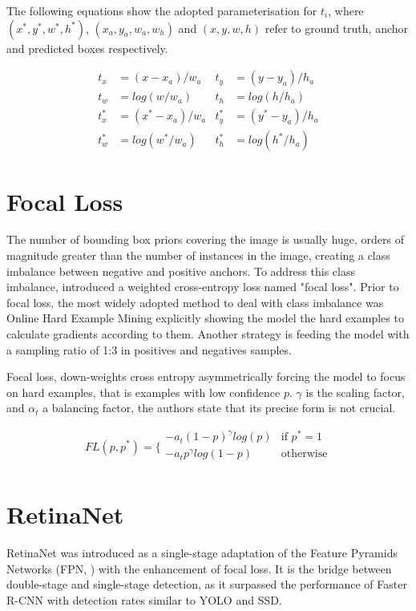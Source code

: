 The following equations show the adopted parameterisation for $t_i$, where $(x^*,y^*,w^*,h^*)$, $(x_a,y_a,w_a,w_h)$ and $(x,y,w,h)$ refer to ground truth, anchor and predicted boxes respectively. 

\begin{align}
t_x		&= (x-x_a)/w_a			&		t_y	&= (y-y_a)/h_a \\
t_w		&= log(w/w_a)			&		t_h 	&= log(h/h_a) \\
t_x^*		&= (x^*-x_a)/w_a		&		t_y^*	&= (y^*-y_a)/h_a \\
t_w^*	&= log(w^*/w_a)		&		t_h^*	&= log(h^*/h_a) 
\end{align}

\section{Focal Loss}
The number of bounding box priors covering the image is usually huge, orders of magnitude greater than the number of instances in the image, creating a class imbalance between negative and positive anchors. To address this class imbalance, \cite{lin2017focal} introduced a weighted cross-entropy loss named "focal loss". Prior to focal loss, the most widely adopted method to deal with class imbalance was Online Hard Example Mining explicitly showing the model the hard examples to calculate gradients according to them. Another strategy is feeding the model with a sampling ratio of 1:3 in positives and negatives samples.

Focal loss, down-weights cross entropy asymmetrically forcing the model to focus on hard examples, that is examples with low confidence $p$. $\gamma$ is the scaling factor, and $\alpha_t$ a balancing factor, the authors state that its precise form is not crucial.

\begin{equation}
    FL(p,p^*)= \bigg\{
    \begin{array}{ll}
      -a_t(1-p)^\gamma log(p) & \text{if } p^*=1 \\
      -a_tp^\gamma log(1-p) &  \text{otherwise}\\
    \end{array}
\end{equation}

\section{RetinaNet}
RetinaNet was introduced as a single-stage adaptation of the Feature Pyramids Networks (FPN, \cite{lin2017feature}) with the enhancement of focal loss. It is the bridge between double-stage and single-stage detection, as it surpassed the performance of Faster R-CNN with detection rates similar to YOLO and SSD.

